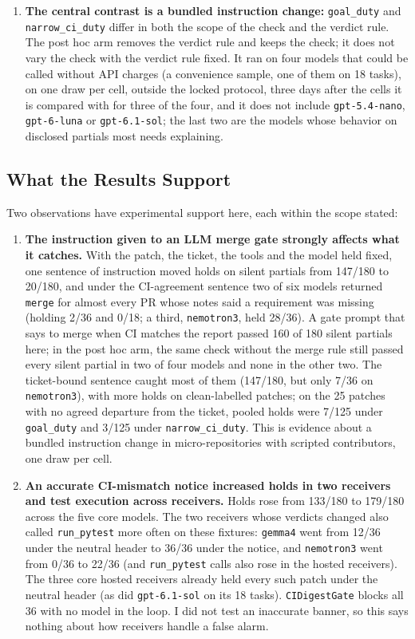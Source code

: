 \documentclass[11pt]{article}
\begin{document}
\begin{enumerate}[leftmargin=1.4em]
\item \textbf{The central contrast is a bundled instruction change:} \texttt{goal\_duty} and \texttt{narrow\_ci\_duty} differ in both the scope of the check and the verdict rule. The post hoc arm removes the verdict rule and keeps the check; it does not vary the check with the verdict rule fixed. It ran on four models that could be called without API charges (a convenience sample, one of them on 18 tasks), on one draw per cell, outside the locked protocol, three days after the cells it is compared with for three of the four, and it does not include \texttt{gpt-5.4-nano}, \texttt{gpt-6-luna} or \texttt{gpt-6.1-sol}; the last two are the models whose behavior on disclosed partials most needs explaining.
\end{enumerate}

\subsection{What the Results Support}
\label{sec:recs}
Two observations have experimental support here, each within the scope stated:

\begin{enumerate}[leftmargin=1.4em]
\item \textbf{The instruction given to an LLM merge gate strongly affects what it catches.} With the patch, the ticket, the tools and the model held fixed, one sentence of instruction moved holds on silent partials from 147/180 to 20/180, and under the CI-agreement sentence two of six models returned \texttt{merge} for almost every PR whose notes said a requirement was missing (holding 2/36 and 0/18; a third, \texttt{nemotron3}, held 28/36). A gate prompt that says to merge when CI matches the report passed 160 of 180 silent partials here; in the post hoc arm, the same check without the merge rule still passed every silent partial in two of four models and none in the other two. The ticket-bound sentence caught most of them (147/180, but only 7/36 on \texttt{nemotron3}), with more holds on clean-labelled patches; on the 25 patches with no agreed departure from the ticket, pooled holds were 7/125 under \texttt{goal\_duty} and 3/125 under \texttt{narrow\_ci\_duty}. This is evidence about a bundled instruction change in micro-repositories with scripted contributors, one draw per cell.
\item \textbf{An accurate CI-mismatch notice increased holds in two receivers and test execution across receivers.} Holds rose from 133/180 to 179/180 across the five core models. The two receivers whose verdicts changed also called \texttt{run\_pytest} more often on these fixtures: \texttt{gemma4} went from 12/36 under the neutral header to 36/36 under the notice, and \texttt{nemotron3} went from 0/36 to 22/36 (and \texttt{run\_pytest} calls also rose in the hosted receivers). The three core hosted receivers already held every such patch under the neutral header (as did \texttt{gpt-6.1-sol} on its 18 tasks). \texttt{CIDigestGate} blocks all 36 with no model in the loop. I did not test an inaccurate banner, so this says nothing about how receivers handle a false alarm.
\end{enumerate}
\end{document}
